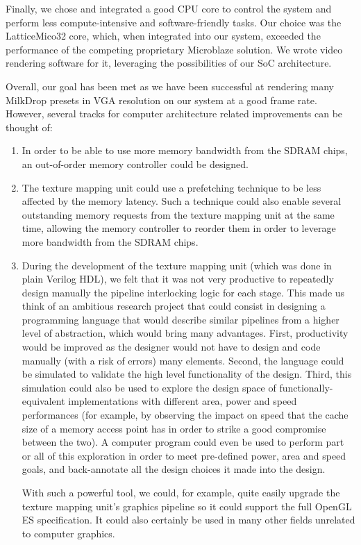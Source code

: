 \documentclass[a4paper,11pt]{kthesis}
\begin{document}
Finally, we chose and integrated a good CPU core to control the system and perform less compute-intensive and software-friendly tasks. Our choice was the LatticeMico32 core, which, when integrated into our system, exceeded the performance of the competing proprietary Microblaze solution. We wrote video rendering software for it, leveraging the possibilities of our SoC architecture.

Overall, our goal has been met as we have been successful at rendering many MilkDrop presets in VGA resolution on our system at a good frame rate. However, several tracks for computer architecture related improvements can be thought of:
\begin{enumerate}
\item In order to be able to use more memory bandwidth from the SDRAM chips, an out-of-order memory controller could be designed.
\item The texture mapping unit could use a prefetching technique to be less affected by the memory latency. Such a technique could also enable several outstanding memory requests from the texture mapping unit at the same time, allowing the memory controller to reorder them in order to leverage more bandwidth from the SDRAM chips.
\item During the development of the texture mapping unit (which was done in plain Verilog HDL), we felt that it was not very productive to repeatedly design manually the pipeline interlocking logic for each stage. This made us think of an ambitious research project that could consist in designing a programming language that would describe similar pipelines from a higher level of abstraction, which would bring many advantages. First, productivity would be improved as the designer would not have to design and code manually (with a risk of errors) many elements. Second, the language could be simulated to validate the high level functionality of the design. Third, this simulation  could also be used to explore the design space of functionally-equivalent implementations with different area, power and speed performances (for example, by observing the impact on speed that the cache size of a memory access point has in order to strike a good compromise between the two). A computer program could even be used to perform part or all of this exploration in order to meet pre-defined power, area and speed goals, and back-annotate all the design choices it made into the design.

With such a powerful tool, we could, for example, quite easily upgrade the texture mapping unit's graphics pipeline so it could support the full OpenGL ES specification. It could also certainly be used in many other fields unrelated to computer graphics.
\end{enumerate}
\end{document}
